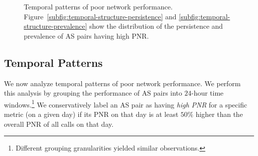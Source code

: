 \begin{figure}[t!]
\centering
\caption{Temporal patterns of poor network performance. 
Figure~\ref{subfig:temporal-structure-persistence} and 
\ref{subfig:temporal-structure-prevalence} show the distribution of 
the persistence and prevalence of AS pairs having high PNR.}
\label{fig:temporal-structure}
\end{figure}





\subsection{Temporal Patterns}
\label{subsec:measurement:voip:temporal}

We now analyze temporal patterns of poor network 
performance. 
We perform this analysis by grouping the 
performance of AS pairs into $24$-hour time 
windows.\footnote{Different grouping granularities
yielded similar observations.}
We conservatively label an AS pair as having 
{\em high PNR} for a specific metric (on a given day) if 
its PNR on that day is at least $50\%$ higher than the 
overall PNR of all calls on that day. 

